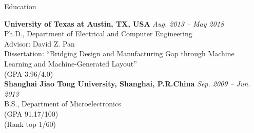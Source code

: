 

\begin{rSection}{Education}


{\bf University of Texas at Austin, TX, USA} \hfill {\em Aug. 2013 -- May 2018} \\ 
Ph.D., Department of Electrical and Computer Engineering \\
Advisor: David Z. Pan \\
Dissertation: ``Bridging Design and Manufacturing Gap through Machine Learning and Machine-Generated Layout'' \\
(GPA 3.96/4.0) \\

{\bf Shanghai Jiao Tong University, Shanghai, P.R.China} \hfill {\em Sep. 2009 -- Jun. 2013} \\ 
B.S., Department of Microelectronics \\
(GPA 91.17/100) \\
(Rank top 1/60)

\end{rSection}

